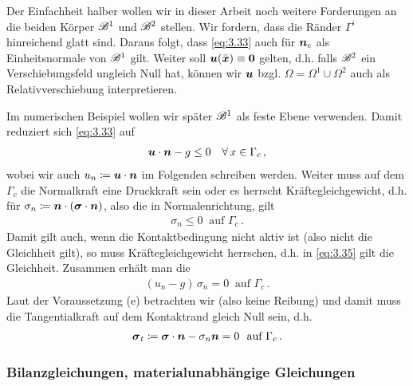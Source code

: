 Der Einfachheit halber wollen wir in dieser Arbeit noch weitere Forderungen an die beiden Körper $\mathscr B^1$ und $\mathscr B^2$ stellen. Wir fordern, dass die Ränder $\Gamma^i$ hinreichend glatt sind. Daraus folgt, dass \eqref{eq:3.33}  auch für $\boldsymbol n_c$ als Einheitsnormale von $\mathscr B^1$ gilt. Weiter soll $\boldsymbol u(\bar{\boldsymbol x})\equiv \boldsymbol 0$ gelten, d.h. falls $\mathscr B^2$ ein Verschiebungsfeld ungleich Null hat, können wir $\boldsymbol u$ bzgl. $\Omega = \Omega^1\cup\Omega^2$ auch als Relativverschiebung interpretieren.


Im numerischen Beispiel wollen wir später $\mathscr B^1$ als feste Ebene verwenden. Damit reduziert sich \eqref{eq:3.33} auf
\begin{align}\label{eq:3.34}
	\boldsymbol u \cdot \boldsymbol n - g \le 0 \quad \forall \, x \in \Gamma_c \, ,
\end{align}
wobei wir auch $u_n \coloneqq \boldsymbol u \cdot \boldsymbol n$ im Folgenden schreiben werden. Weiter muss auf dem  $\Gamma_c$ die Normalkraft eine Druckkraft sein oder es herrscht Kräftegleichgewicht, d.h. für  $\sigma_n \coloneqq \boldsymbol n\cdot (\boldsymbol \sigma\cdot \boldsymbol n)$, also die  in Normalenrichtung, gilt
\begin{align}\label{eq:3.35}
	\sigma_n \le 0  \ \text{ auf }  \Gamma_c \, .
\end{align}
Damit gilt auch, wenn die Kontaktbedingung nicht aktiv ist (also nicht die Gleichheit gilt), so muss Kräftegleichgewicht herrschen, d.h. in \eqref{eq:3.35} gilt die Gleichheit. Zusammen erhält man die \textit{}
\begin{align}\label{eq:3.36}
	(u_n - g )\,   \sigma_n = 0 \ \text{ auf } \Gamma_c \, .
\end{align}
Laut der Voraussetzung (e) betrachten wir  (also keine Reibung) und damit muss die Tangentialkraft auf dem Kontaktrand gleich Null sein, d.h.
\begin{align}\label{eq:3.37}
	\bs \sigma_t \coloneqq \bs \sigma \cdot \bs n - \sigma_n \bs n = 0 \ \text{ auf } \Gamma_c \, .
\end{align}



\subsubsection{Bilanzgleichungen, materialunabhängige Gleichungen}


